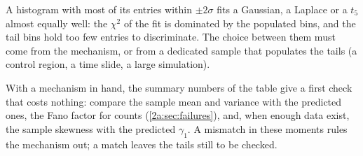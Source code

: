 \begin{pitfall}
A histogram with most of its entries within $\pm2\sigma$ fits a Gaussian, a Laplace or a $t_5$ almost equally well: the $\chi^2$ of the fit is dominated by the populated bins, and the tail bins hold too few entries to discriminate. The choice between them must come from the mechanism, or from a dedicated sample that populates the tails (a control region, a time slide, a large simulation).
\end{pitfall}

With a mechanism in hand, the summary numbers of the table give a first check that costs nothing: compare the sample mean and variance with the predicted ones, the Fano factor for counts (\cref{2a:sec:failures}), and, when enough data exist, the sample skewness with the predicted $\gamma_1$. A mismatch in these moments rules the mechanism out; a match leaves the tails still to be checked.

